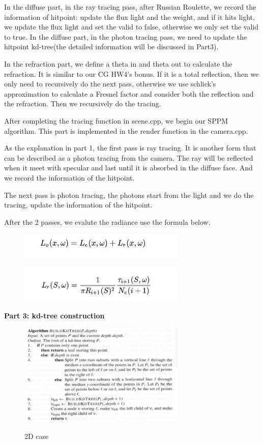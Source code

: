 \documentclass[acmtog]{acmart}
\begin{document}
In the diffuse part, in the ray tracing pass, after Russian Roulette, we record the information of hitpoint: update the flux light and the weight, and if it hits light, we update the flux light and set the valid to false, otherwise we only set the valid to true. In the diffuse part, in the photon tracing pass, we need to update the hitpoint kd-tree(the detailed information will be discussed in Part3).

In the refraction part, we define a theta in and theta out to calculate the refraction. It is similar to our CG HW4's bonus. If it is a total reflection, then we only need to recursively do the next pass, otherwise we use schlick's approximation to calculate a Fresnel factor and consider both the reflection and the refraction. Then we recursively do the tracing.

After completing the tracing function in scene.cpp, we begin our SPPM algorithm. This part is implemented in the render function in the camera.cpp. 

As the explanation in part 1, the first pass is ray tracing. 
It is another form that can be described as a photon tracing from the camera. 
The ray will be reflected when it meet with specular and last until it is absorbed in the diffuse face. And we record the information of the hitpoint.

The next pass is photon tracing, the photons start from the light and we do the tracing, update the information of the hitpoint.

After the 2 passes, we evalute the radiance use the formula below.
\begin{figure}[h]
	\centering
	{\includegraphics[width=8cm]{l.JPG}}	
\end{figure}
\begin{figure}[h]
	\centering
	{\includegraphics[width=8cm]{lr.JPG}}	
\end{figure}



\quad \textbf{Part 3: kd-tree construction}
\begin{figure}[h]
	\centering
	{\includegraphics[width=8cm]{kdtree.JPG}}	
	\caption{2D case}
\end{figure}
\end{document}
